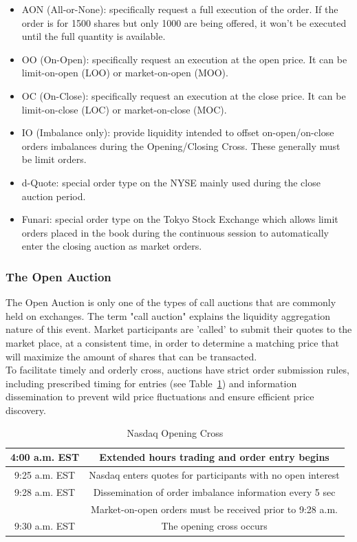 \begin{itemize}
\item  AON (All-or-None): specifically request a full execution of the order. If the order is for 1500 shares but only 1000 are being offered, it won't be executed until the full quantity is available.

\item  OO (On-Open): specifically request an execution at the open price. It can be limit-on-open (LOO) or market-on-open (MOO).
\item  OC (On-Close): specifically request an execution at the close price. It can be limit-on-close (LOC) or market-on-close (MOC).
\item  IO (Imbalance only): provide liquidity intended to offset on-open/on-close orders imbalances during the Opening/Closing Cross. These generally must be limit orders.
\item  d-Quote: special order type on the NYSE mainly used during the close auction period.
\item  Funari: special order type on the Tokyo Stock Exchange which allows limit orders placed in the book during the continuous session to automatically enter the closing auction as market orders.
\end{itemize} 




\subsubsection{The Open Auction}

The Open Auction is only one of the types of call auctions that are commonly held on exchanges. The term "call auction" explains the liquidity aggregation nature of this event. Market participants are 'called' to submit their quotes to the market place, at a consistent time, in order to determine a matching price that will maximize the amount of shares that can be transacted. \\

To facilitate timely and orderly cross, auctions have strict order submission rules, including prescribed timing for entries (see Table~\ref{tab:NASDAQopen}) and information dissemination to prevent wild price fluctuations and ensure efficient price discovery. \\

\begin{table}[!ht]
   \centering
   \caption{Nasdaq Opening Cross\label{tab:NASDAQopen}}
   \hspace*{-0.8cm}
   \begin{tabular}{cc} 
	4:00 a.m. EST & Extended hours trading and order entry begins  \\ \hline
	9:25 a.m. EST & Nasdaq enters quotes for participants with no open interest \\ \hline
	9:28 a.m. EST & Dissemination of order imbalance information every 5 sec  \\ 
	 & Market-on-open orders must be received prior to 9:28 a.m.   \\ \hline	
	9:30 a.m. EST & The opening cross occurs		
   \end{tabular}
\end{table}	


